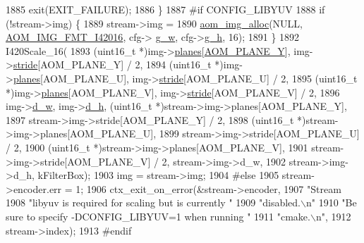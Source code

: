 \begin{DoxyCodeInclude}
{{{{{{{{{{{{{{{{{{{{{{{{{{{{{{{{{1885         exit(EXIT\_FAILURE);
1886       \}
1887 \textcolor{preprocessor}{#if CONFIG\_LIBYUV}
1888       \textcolor{keywordflow}{if} (!stream->img) \{
1889         stream->img =
1890             \hyperlink{aom__image_8h_a570db29fbd122951235a08fe9375f6bb}{aom\_img\_alloc}(NULL, \hyperlink{aom__image_8h_a930317c04b4bd0a660bb5e744055523ca20a9cf30277260685642b4cfb4e9273b}{AOM\_IMG\_FMT\_I42016}, cfg->
      \hyperlink{structaom__codec__enc__cfg_a80cb459c5ef3c7e1516f617c4c9d6eab}{g\_w}, cfg->\hyperlink{structaom__codec__enc__cfg_a37b0f57b63bec8d133df8901d4407ee6}{g\_h}, 16);
1891       \}
1892       I420Scale\_16(
1893           (uint16\_t *)img->\hyperlink{structaom__image_ac54dbc5237ca2914f9ec30105dfbe302}{planes}[\hyperlink{aom__image_8h_a2ad22076006b15cf809edcaa33f6d339}{AOM\_PLANE\_Y}], img->\hyperlink{structaom__image_a6dc693d7dbc9eb06c0cdde307ca58372}{stride}[AOM\_PLANE\_Y] / 2,
1894           (uint16\_t *)img->\hyperlink{structaom__image_ac54dbc5237ca2914f9ec30105dfbe302}{planes}[AOM\_PLANE\_U], img->\hyperlink{structaom__image_a6dc693d7dbc9eb06c0cdde307ca58372}{stride}[AOM\_PLANE\_U] / 2,
1895           (uint16\_t *)img->\hyperlink{structaom__image_ac54dbc5237ca2914f9ec30105dfbe302}{planes}[AOM\_PLANE\_V], img->\hyperlink{structaom__image_a6dc693d7dbc9eb06c0cdde307ca58372}{stride}[AOM\_PLANE\_V] / 2,
1896           img->\hyperlink{structaom__image_a89f80b1f58d608b9d2080635f4359034}{d\_w}, img->\hyperlink{structaom__image_ab986419a1f0fff93a2dc505f47194988}{d\_h}, (uint16\_t *)stream->img->planes[AOM\_PLANE\_Y],
1897           stream->img->stride[AOM\_PLANE\_Y] / 2,
1898           (uint16\_t *)stream->img->planes[AOM\_PLANE\_U],
1899           stream->img->stride[AOM\_PLANE\_U] / 2,
1900           (uint16\_t *)stream->img->planes[AOM\_PLANE\_V],
1901           stream->img->stride[AOM\_PLANE\_V] / 2, stream->img->d\_w,
1902           stream->img->d\_h, kFilterBox);
1903       img = stream->img;
1904 \textcolor{preprocessor}{#else}
1905       stream->encoder.err = 1;
1906       ctx\_exit\_on\_error(&stream->encoder,
1907                         \textcolor{stringliteral}{"Stream %
1908                         \textcolor{stringliteral}{"libyuv is required for scaling but is currently "}
1909                         \textcolor{stringliteral}{"disabled.\(\backslash\)n"}
1910                         \textcolor{stringliteral}{"Be sure to specify -DCONFIG\_LIBYUV=1 when running "}
1911                         \textcolor{stringliteral}{"cmake.\(\backslash\)n"},
1912                         stream->index);
1913 \textcolor{preprocessor}{#endif}
}}}}}}}}}}}}}}}}}}}}}}}}}}}}}}}}}}
\end{DoxyCodeInclude}
